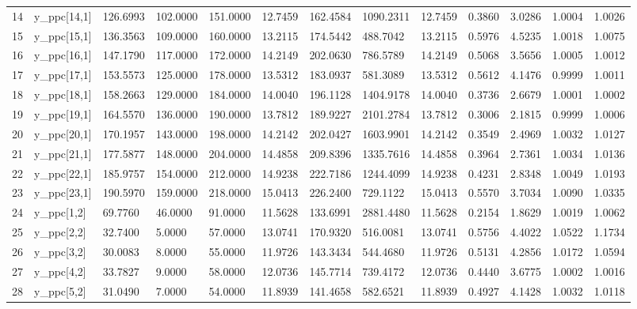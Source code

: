 \begin{table}[ht]
\begin{tabular}{rllllllllllll}
  14 & y\_ppc[14,1] & 126.6993 & 102.0000 & 151.0000 & 12.7459 & 162.4584 & 1090.2311 & 12.7459 & 0.3860 & 3.0286 & 1.0004 & 1.0026 \\ 
  15 & y\_ppc[15,1] & 136.3563 & 109.0000 & 160.0000 & 13.2115 & 174.5442 &  488.7042 & 13.2115 & 0.5976 & 4.5235 & 1.0018 & 1.0075 \\ 
  16 & y\_ppc[16,1] & 147.1790 & 117.0000 & 172.0000 & 14.2149 & 202.0630 &  786.5789 & 14.2149 & 0.5068 & 3.5656 & 1.0005 & 1.0012 \\ 
  17 & y\_ppc[17,1] & 153.5573 & 125.0000 & 178.0000 & 13.5312 & 183.0937 &  581.3089 & 13.5312 & 0.5612 & 4.1476 & 0.9999 & 1.0011 \\ 
  18 & y\_ppc[18,1] & 158.2663 & 129.0000 & 184.0000 & 14.0040 & 196.1128 & 1404.9178 & 14.0040 & 0.3736 & 2.6679 & 1.0001 & 1.0002 \\ 
  19 & y\_ppc[19,1] & 164.5570 & 136.0000 & 190.0000 & 13.7812 & 189.9227 & 2101.2784 & 13.7812 & 0.3006 & 2.1815 & 0.9999 & 1.0006 \\ 
  20 & y\_ppc[20,1] & 170.1957 & 143.0000 & 198.0000 & 14.2142 & 202.0427 & 1603.9901 & 14.2142 & 0.3549 & 2.4969 & 1.0032 & 1.0127 \\ 
  21 & y\_ppc[21,1] & 177.5877 & 148.0000 & 204.0000 & 14.4858 & 209.8396 & 1335.7616 & 14.4858 & 0.3964 & 2.7361 & 1.0034 & 1.0136 \\ 
  22 & y\_ppc[22,1] & 185.9757 & 154.0000 & 212.0000 & 14.9238 & 222.7186 & 1244.4099 & 14.9238 & 0.4231 & 2.8348 & 1.0049 & 1.0193 \\ 
  23 & y\_ppc[23,1] & 190.5970 & 159.0000 & 218.0000 & 15.0413 & 226.2400 &  729.1122 & 15.0413 & 0.5570 & 3.7034 & 1.0090 & 1.0335 \\ 
  24 & y\_ppc[1,2] &  69.7760 &  46.0000 &  91.0000 & 11.5628 & 133.6991 & 2881.4480 & 11.5628 & 0.2154 & 1.8629 & 1.0019 & 1.0062 \\ 
  25 & y\_ppc[2,2] &  32.7400 &   5.0000 &  57.0000 & 13.0741 & 170.9320 &  516.0081 & 13.0741 & 0.5756 & 4.4022 & 1.0522 & 1.1734 \\ 
  26 & y\_ppc[3,2] &  30.0083 &   8.0000 &  55.0000 & 11.9726 & 143.3434 &  544.4680 & 11.9726 & 0.5131 & 4.2856 & 1.0172 & 1.0594 \\ 
  27 & y\_ppc[4,2] &  33.7827 &   9.0000 &  58.0000 & 12.0736 & 145.7714 &  739.4172 & 12.0736 & 0.4440 & 3.6775 & 1.0002 & 1.0016 \\ 
  28 & y\_ppc[5,2] &  31.0490 &   7.0000 &  54.0000 & 11.8939 & 141.4658 &  582.6521 & 11.8939 & 0.4927 & 4.1428 & 1.0032 & 1.0118 \\ 

\end{tabular}
\end{table}
